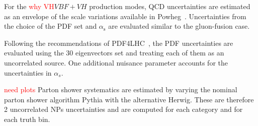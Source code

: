 For the \textcolor{red}{why VH}$VBF+VH$ production modes, QCD uncertainties are estimated as an envelope of the scale variations available in Powheg~\cite{Nason:2009ai,VBFVH_theoryUnc}. Uncertainties from the choice of the PDF set and $\alpha_\mathrm{s}$ are evaluated similar to the gluon-fusion case.

Following the recommendations of PDF4LHC~\cite{pdf4lhc}, the PDF uncertainties are evaluated using the 30 eigenvectors set and treating each of them as an uncorrelated source. One additional nuisance parameter accounts for the uncertainties in $\alpha_{s}$.

\textcolor{red}{need plots} Parton shower systematics are estimated by varying the nominal parton shower algorithm Pythia with the alternative Herwig. These are therefore 2 uncorrelated NPs uncertainties and are computed for each category and for each truth bin.


